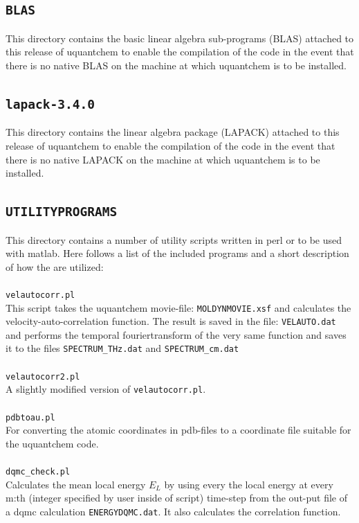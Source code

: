 \documentclass[a4paper,twoside,openany]{book}
\begin{document}
{{\subsection{\texttt{BLAS}}
This directory contains the basic linear algebra sub-programs (BLAS) attached to this release of uquantchem to enable 
the compilation of the code in the event that there is no native BLAS on the machine at which uquantchem is to be installed.
\subsection{\texttt{lapack-3.4.0}}
This directory contains the linear algebra package (LAPACK) attached to this release of uquantchem to enable 
the compilation of the code in the event that there is no native LAPACK on the machine at which uquantchem is to be installed.
\subsection{\texttt{UTILITYPROGRAMS}}
This directory contains a number of utility scripts written in perl or to be used with matlab. Here follows a list of the included programs 
and a short description of how the are utilized: \\ \\
\texttt{velautocorr.pl} \\
This script takes the uquantchem movie-file: \texttt{MOLDYNMOVIE.xsf}  
and calculates the velocity-auto-correlation function. The   
result is saved in the file: \texttt{VELAUTO.dat} and performs the temporal fouriertransform of the very same function and saves it to the files \texttt{SPECTRUM\_THz.dat} and \texttt{SPECTRUM\_cm.dat}  \\ \\
\texttt{velautocorr2.pl} \\
A slightly modified version of \texttt{velautocorr.pl}. \\ \\
\texttt{pdbtoau.pl} \\
For converting the atomic coordinates in pdb-files
to a coordinate file suitable for the uquantchem code. \\ \\
\texttt{dqmc\_check.pl}\\
Calculates the mean local energy $E_{L}$ by using every the local energy at every m:th (integer specified by user inside of script) time-step from the out-put file of a dqmc calculation \texttt{ENERGYDQMC.dat}. It also calculates the correlation function.\\ \\
}}
\end{document}
